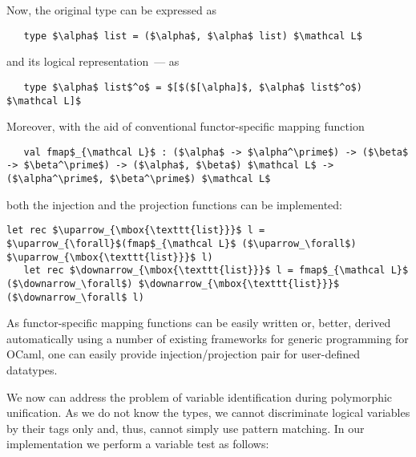 Now, the original type can be expressed as

\begin{lstlisting}
   type $\alpha$ list = ($\alpha$, $\alpha$ list) $\mathcal L$
\end{lstlisting}

\noindent and its logical representation~--- as

\begin{lstlisting}
   type $\alpha$ list$^o$ = $[$($[\alpha]$, $\alpha$ list$^o$) $\mathcal L]$
\end{lstlisting}

Moreover, with the aid of conventional functor-specific mapping function

\begin{lstlisting}
   val fmap$_{\mathcal L}$ : ($\alpha$ -> $\alpha^\prime$) -> ($\beta$ -> $\beta^\prime$) -> ($\alpha$, $\beta$) $\mathcal L$ -> ($\alpha^\prime$, $\beta^\prime$) $\mathcal L$
\end{lstlisting}

\noindent both the injection and the projection functions can be implemented:

\begin{lstlisting}[mathescape=true]
   let rec $\uparrow_{\mbox{\texttt{list}}}$ l = $\uparrow_{\forall}$(fmap$_{\mathcal L}$ ($\uparrow_\forall$) $\uparrow_{\mbox{\texttt{list}}}$ l)
   let rec $\downarrow_{\mbox{\texttt{list}}}$ l = fmap$_{\mathcal L}$ ($\downarrow_\forall$) $\downarrow_{\mbox{\texttt{list}}}$ ($\downarrow_\forall$ l)
\end{lstlisting}

As functor-specific mapping functions can be easily written or, better, derived automatically using a number of existing frameworks for
generic programming for OCaml, one can easily provide injection/projection pair for user-defined datatypes.

We now can address the problem of variable identification during polymorphic unification. As we do not know the types, we cannot discriminate logical
variables by their tags only and, thus, cannot simply use pattern matching. In our implementation we perform a variable test
as follows:

